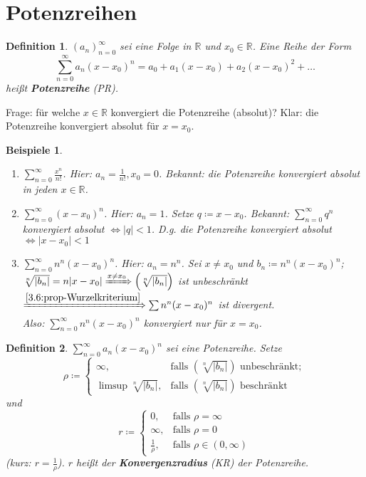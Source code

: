 \documentclass[14pt,titlepage,ngerman,a4paper,headsepline,DIV15,halfparskip*]{scrartcl}
\newcommand{\R}{\mathbb{R}}
\theoremstyle{named}
\theoremstyle{dotless}
\newtheorem*{beispiele}{Beispiele}
\newtheorem*{definition}{Definition}
\begin{document}
\newpage


\section{Potenzreihen}

\begin{definition}
	$(a_{n})_{n=0}^{\infty}$ sei eine Folge in $\R$ und $x_{0} \in \R$. Eine Reihe der Form
		$$ \sum_{n=0}^{\infty} a_{n} (x - x_{0})^{n} = a_{0} + a_{1} (x - x_{0}) + a_{2} (x - x_{0})^{2} + \dotsc $$
		hei{\ss}t \textbf{Potenzreihe} (PR). 
\end{definition}

Frage: für welche $x \in \R$ konvergiert die Potenzreihe (absolut)? Klar: die Potenzreihe konvergiert absolut für $x = x_{0}$.

\begin{beispiele} ~\
	\begin{enumerate}
		\item $\sum_{n=0}^{\infty} \frac{x^{n}}{n!}$. Hier: $a_{n} = \frac{1}{n!}, x_{0} = 0$. Bekannt: die Potenzreihe konvergiert absolut in jeden $x \in \R$.
		\item $\sum_{n=0}^{\infty} (x - x_{0})^{n}$. Hier: $a_{n} = 1$. Setze $q \coloneqq x - x_{0}$. Bekannt: $\sum_{n=0}^{\infty} q^{n}$ konvergiert absolut $\iff |q| < 1$. D.g. die Potenzreihe konvergiert absolut $\iff |x - x_{0} | < 1$
		\item $\sum_{n=0}^{\infty} n^{n} (x - x_{0})^{n}$. Hier: $a_{n} = n^{n}$. Sei $x \neq x_{0}$ und $b_{n} \coloneqq n^{n} (x - x_{0})^{n}$; $\sqrt[n]{|b_{n}|} = n |x - x_{0}| \xRightarrow[]{x \neq x_{0}} \left( \sqrt[n]{|b_{n}|} \right)$ ist unbeschränkt $\xRightarrow[]{\ref{3.6:prop-Wurzelkriterium}} \sum n^{n} (x - x_{0})^{n}$ ist divergent. \\
			Also: $\sum_{n=0}^{\infty} n^{n} (x - x_{0})^{n}$ konvergiert nur für $x = x_{0}$.
	\end{enumerate}	
\end{beispiele}

\begin{definition}
	$\sum_{n=0}^{\infty} a_{n} (x - x_{0})^{n}$ sei eine Potenzreihe. Setze
		$$ \rho \coloneqq \begin{cases}
			\infty, & \text{falls } \left( \sqrt[n]{|b_{n}|} \right) \text{ unbeschränkt}; \\
			\limsup \sqrt[n]{|b_{n}|}, & \text{falls } \left( \sqrt[n]{|b_{n}|} \right) \text{ beschränkt}
		\end{cases} $$
	und
		$$ r \coloneqq \begin{cases}
			0, & \text{falls } \rho = \infty \\
			\infty, & \text{falls } \rho = 0 \\
			\frac{1}{\rho}, & \text{falls } \rho \in (0, \infty)
		\end{cases} $$
	(kurz: \glqq $r = \frac{1}{\rho}$\grqq). $r$ hei{\ss}t der \textbf{Konvergenzradius} (KR) der Potenzreihe.
\end{definition}
\end{document}
